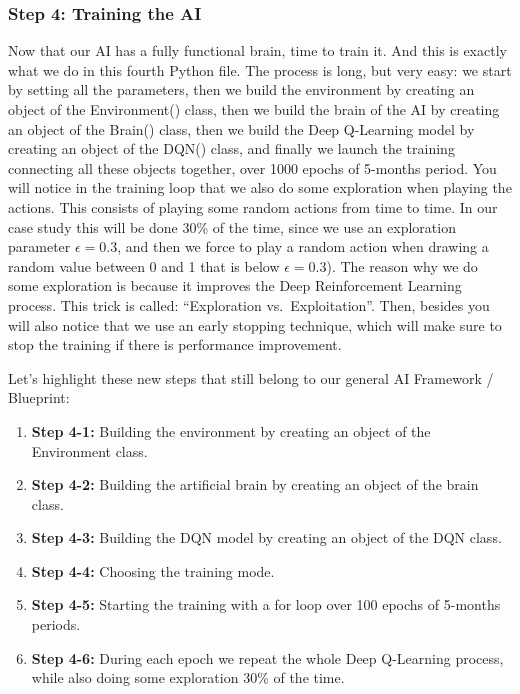 \documentclass[]{book}
\begin{document}
\newpage

\subsubsection{Step 4: Training the AI}

Now that our AI has a fully functional brain, time to train it. And this is exactly what we do in this fourth Python file. The process is long, but very easy: we start by setting all the parameters, then we build the environment by creating an object of the Environment() class, then we build the brain of the AI by creating an object of the Brain() class, then we build the Deep Q-Learning model by creating an object of the DQN() class, and finally we launch the training connecting all these objects together, over 1000 epochs of 5-months period. You will notice in the training loop that we also do some exploration when playing the actions. This consists of playing some random actions from time to time. In our case study this will be done 30\% of the time, since we use an exploration parameter \(\epsilon = 0.3\), and then we force to play a random action when drawing a random value between 0 and 1 that is below \(\epsilon = 0.3\)). The reason why we do some exploration is because it improves the Deep Reinforcement Learning process. This trick is called: ``Exploration vs.~Exploitation''. Then, besides you will also notice that we use an early stopping technique, which will make sure to stop the training if there is performance improvement.

Let's highlight these new steps that still belong to our general AI Framework / Blueprint:

\begin{enumerate}
    \item \textbf{Step 4-1:} Building the environment by creating an object of the Environment class.
    \item \textbf{Step 4-2:} Building the artificial brain by creating an object of the brain class.
    \item \textbf{Step 4-3:} Building the DQN model by creating an object of the DQN class.
    \item \textbf{Step 4-4:} Choosing the training mode.
    \item \textbf{Step 4-5:} Starting the training with a for loop over 100 epochs of 5-months periods.
    \item \textbf{Step 4-6:} During each epoch we repeat the whole Deep Q-Learning process, while also doing some exploration 30\% of the time.
\end{enumerate}
\end{document}
